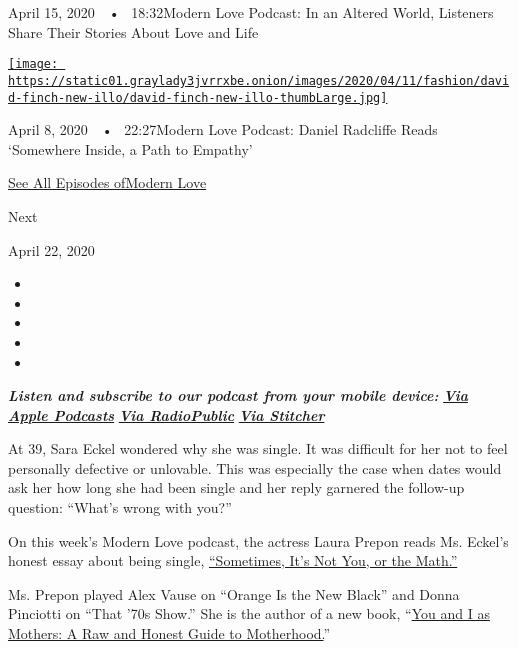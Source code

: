 April 15, 2020~~•~ 18:32Modern Love Podcast: In an Altered World,
Listeners Share Their Stories About Love and Life

\href{https://www.nytimes3xbfgragh.onion/2020/04/08/style/modern-love-podcast-daniel-radcliffe.html?action=click\&module=audio-series-bar\&region=header\&pgtype=Article}{\texttt{[image: https://static01.graylady3jvrrxbe.onion/images/2020/04/11/fashion/david-finch-new-illo/david-finch-new-illo-thumbLarge.jpg]}}

April 8, 2020~~•~ 22:27Modern Love Podcast: Daniel Radcliffe Reads
`Somewhere Inside, a Path to Empathy'

\href{https://www.nytimes3xbfgragh.onion/column/modern-love-podcast}{See
All Episodes ofModern Love}

Next

April 22, 2020

\begin{itemize}
\item
\item
\item
\item
\item
\end{itemize}

\emph{\textbf{Listen and subscribe to our podcast from your mobile
device:}}
\textbf{\href{https://itunes.apple.com/us/podcast/modern-love/id1065559535?mt=2}{\emph{Via
Apple Podcasts}}} \emph{\textbf{\textbar{}}}
\textbf{\href{https://radiopublic.com/ModernLove}{\emph{Via
RadioPublic}}} \emph{\textbf{\textbar{}}}
\textbf{\href{https://www.stitcher.com/podcast/wbur/modern-love}{\emph{Via
Stitcher}}}

At 39, Sara Eckel wondered why she was single. It was difficult for her
not to feel personally defective or unlovable. This was especially the
case when dates would ask her how long she had been single and her reply
garnered the follow-up question: ``What's wrong with you?''

On this week's Modern Love podcast, the actress Laura Prepon reads Ms.
Eckel's honest essay about being single,
\href{https://www.nytimes3xbfgragh.onion/2011/09/25/style/modern-love-sometimes-its-not-you-or-the-math.html}{``Sometimes,
It's Not You, or the Math.''}

Ms. Prepon played Alex Vause on ``Orange Is the New Black'' and Donna
Pinciotti on ``That '70s Show.'' She is the author of a new book,
``\href{https://bookshop.org/books/you-and-i-as-mothers-a-raw-and-honest-guide-to-motherhood/9781419742972}{You
and I as Mothers: A Raw and Honest Guide to Motherhood.}''

